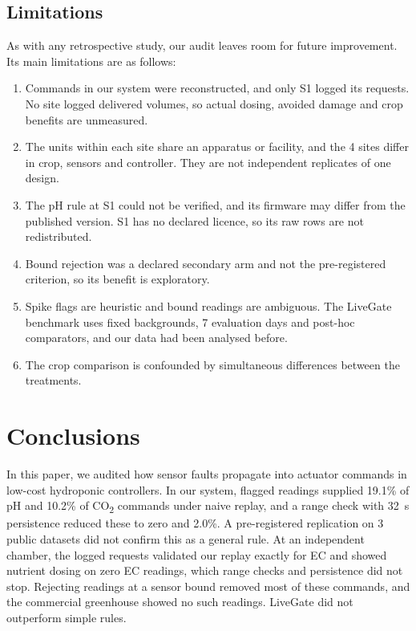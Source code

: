 \documentclass[preprint,12pt,doubleblind]{elsarticle}
\newcommand{\COtwo}{CO\textsubscript{2}}
\begin{document}
\subsection{Limitations}
As with any retrospective study, our audit leaves room for future improvement. Its main limitations are as follows:
\begin{enumerate}
\item Commands in our system were reconstructed, and only S1 logged its requests. No site logged delivered volumes, so actual dosing, avoided damage and crop benefits are unmeasured.
\item The units within each site share an apparatus or facility, and the 4 sites differ in crop, sensors and controller. They are not independent replicates of one design.
\item The pH rule at S1 could not be verified, and its firmware may differ from the published version. S1 has no declared licence, so its raw rows are not redistributed.
\item Bound rejection was a declared secondary arm and not the pre-registered criterion, so its benefit is exploratory.
\item Spike flags are heuristic and bound readings are ambiguous. The LiveGate benchmark uses fixed backgrounds, 7 evaluation days and post-hoc comparators, and our data had been analysed before.
\item The crop comparison is confounded by simultaneous differences between the treatments.
\end{enumerate}

\section{Conclusions}
\label{sec:conclusions}
In this paper, we audited how sensor faults propagate into actuator commands in low-cost hydroponic controllers. In our system, flagged readings supplied 19.1\% of pH and 10.2\% of \COtwo{} commands under naive replay, and a range check with 32~s persistence reduced these to zero and 2.0\%. A pre-registered replication on 3 public datasets did not confirm this as a general rule. At an independent chamber, the logged requests validated our replay exactly for EC and showed nutrient dosing on zero EC readings, which range checks and persistence did not stop. Rejecting readings at a sensor bound removed most of these commands, and the commercial greenhouse showed no such readings. LiveGate did not outperform simple rules.
\end{document}
